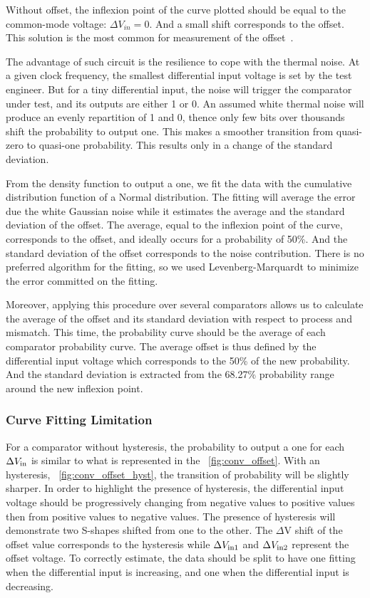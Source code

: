 Without offset, the inflexion point of the curve plotted should be equal to the common-mode voltage: $\Delta V_{in} = 0$. And a small shift corresponds to the offset. This solution is the most common for measurement of the offset~\cite{4395036,6482245,6644886}.

The advantage of such circuit is the resilience to cope with the thermal noise. At a given clock frequency, the smallest differential input voltage is set by the test engineer. But for a tiny differential input, the noise will trigger the comparator under test, and its outputs are either 1 or 0. An assumed white thermal noise will produce an evenly repartition of 1 and 0, thence only few bits over thousands shift the probability to output one. This makes a smoother transition from quasi-zero to quasi-one probability. This results only in a change of the standard deviation.

From the density function to output a one, we fit the data with the cumulative distribution function of a Normal distribution. The fitting will average the error due the white Gaussian noise while it estimates the average and the standard deviation of the offset. The average, equal to the inflexion point of the curve, corresponds to the offset, and ideally occurs for a probability of 50\%. And the standard deviation of the offset corresponds to the noise contribution. There is no preferred algorithm for the fitting, so we used Levenberg-Marquardt to minimize the error committed on the fitting.

Moreover, applying this procedure over several comparators allows us to calculate the average of the offset and its standard deviation with respect to process and mismatch. This time, the probability curve should be the average of each comparator probability curve. The average offset is thus defined by the differential input voltage which corresponds to the 50\% of the new probability. And the standard deviation is extracted from the 68.27\% probability range around the new inflexion point.

\subsubsection{Curve Fitting Limitation}
For a comparator without hysteresis, the probability to output a one for each $\Delta V_{\rm in}$ is similar to what is represented in the \figurename~\ref{fig:conv_offset}. With an hysteresis, \figurename~\ref{fig:conv_offset_hyst}, the transition of probability will be slightly sharper. In order to highlight the presence of hysteresis, the differential input voltage should be progressively changing from negative values to positive values then from positive values to negative values. The presence of hysteresis will demonstrate two S-shapes shifted from one to the other. The $\Delta$V shift of the offset value corresponds to the hysteresis while $\Delta V_{\rm in1}$ and $\Delta V_{\rm in2}$ represent the offset voltage. To correctly estimate, the data should be split to have one fitting when the differential input is increasing, and one when the differential input is decreasing.

